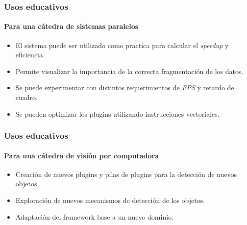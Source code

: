 \documentclass[11pt,a4paper,spanish]{beamer}
\begin{document}
\begin{frame}

\frametitle{Usos educativos}

\framesubtitle{Para una cátedra de sistemas paralelos}

\begin{itemize}

	\item El sistema puede ser utilizado como practica para calcular el
		\emph{speedup} y eficiencia.
	
	\item Permite visualizar la importancia de la correcta fragmentación de
		los datos.

	\item Se puede experimentar con distintos requerimientos de \emph{FPS} y
		retardo de cuadro.

	\item Se pueden optimizar los plugins utilizando instrucciones
		vectoriales.

\end{itemize}

\end{frame}

\begin{frame}

\frametitle{Usos educativos}

\framesubtitle{Para una cátedra de visión por computadora}

\begin{itemize}

	\item Creación de nuevos plugins y pilas de plugins para la detección de
		nuevos objetos.

	\item Exploración de nuevos mecanismos de detección de los objetos.

	\item Adaptación del framework base a un nuevo dominio.

\end{itemize}

\end{frame}
\end{document}
